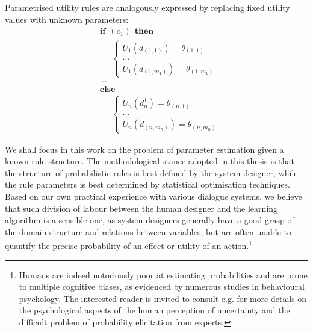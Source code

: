 Parametrised utility rules are analogously expressed by replacing fixed utility values with unknown parameters:
\begin{equation}
\begin{aligned}
& \textbf{if} \ \ (c_{1}) \ \ \textbf{then} \\ 
& \;\;\;\;\; \begin{cases}
U_1(d_{(1,1)}) = \theta_{(1,1)} \\
 ... \\
U_1(d_{(1,m_1)}) = \theta_{(1,m_1)}
\end{cases} \\[3mm]
& ...  \\
& \textbf{else} \\
& \;\;\;\;\; \begin{cases}
U_n(d_n^1) = \theta_{(n,1)} \\
... \\
U_n(d_{(n,m_n)}) = \theta_{(n,m_n)}
\end{cases}
\end{aligned}
\end{equation} 

We shall focus in this work on the problem of parameter estimation given a known rule structure.  The methodological stance adopted in this thesis is that the structure of probabilistic rules is best defined by the system designer, while the rule parameters is best determined by statistical optimisation techniques. Based on our own practical experience with various dialogue systems, we believe that such division of labour between the human designer and the learning algorithm is a sensible one, as system designers generally have a good grasp of the domain structure and relations between variables, but are often unable to quantify the precise probability of an effect or utility of an action.\footnote{Humans are indeed notoriously poor at estimating probabilities and are prone to multiple cognitive biases, as evidenced by numerous studies in behavioural psychology.  The interested reader is invited to consult e.g. \cite{KahnemanSlovicTversky81,morganhenrion} for more details on the psychological aspects of the human perception of uncertainty and the difficult problem of probability elicitation from experts.}

